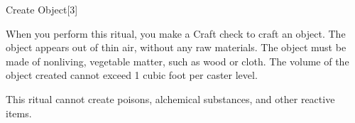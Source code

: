 \begin{spellsection}{Create Object}[3]
    \begin{spellheader}
    \end{spellheader}
    \begin{spellcontent}
        \begin{spelltargetinginfo}
            \spellrng{\rngclose}
        \end{spelltargetinginfo}
        \begin{spelleffects}

            \spelleffect When you perform this ritual, you make a Craft check to craft an object. The object appears out of thin air, without any raw materials. The object must be made of nonliving, vegetable matter, such as wood or cloth. The volume of the object created cannot exceed 1 cubic foot per caster level.
            \spelldur \durext
        \end{spelleffects}
    \end{spellcontent}
    \begin{spellfooter}
        \spellnotes This ritual cannot create poisons, alchemical substances, and other reactive items.
    \end{spellfooter}
\end{spellsection}

